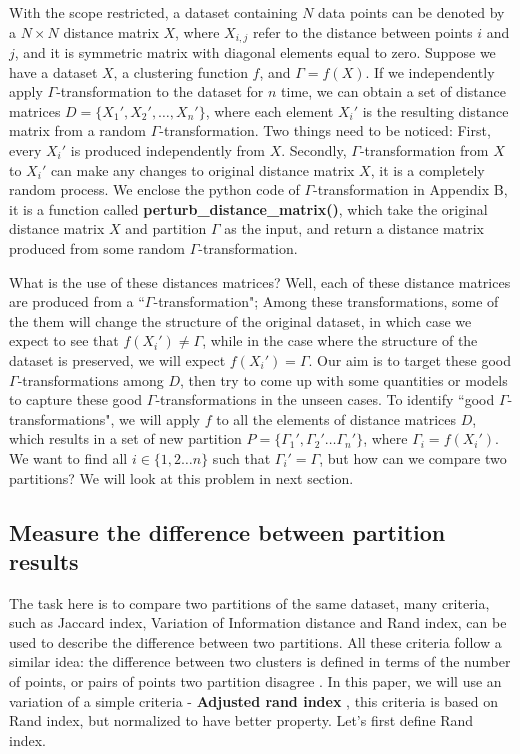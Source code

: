 \documentclass{uonmathreport}
\begin{document}
With the scope restricted, a dataset containing $N$ data points can be denoted by a $N\times N$ distance matrix $X$, where $X_{i,j}$ refer to the distance between points $i$ and $j$, and it is symmetric matrix with diagonal elements equal to zero. Suppose we have a dataset $X$, a clustering function $f$, and $\Gamma = f(X)$. If we independently apply $\Gamma$-transformation to the dataset for $n$ time, we can obtain a set of distance matrices $D = \{X_1',X_2',\ldots , X_n'\}$, where each element $X_i'$ is the resulting distance matrix from a random $\Gamma$-transformation. Two things need to be noticed: First, every $X_i'$ is produced independently from $X$. Secondly, $\Gamma$-transformation from $X$ to $X_i'$ can make any changes to original distance matrix $X$, it is a completely random process. We enclose the python code of $\Gamma$-transformation in Appendix B, it is a function called \textbf{perturb\_distance\_matrix()}, which take the original distance matrix $X$ and partition $\Gamma$ as the input, and return a distance matrix produced from some random $\Gamma$-transformation.

What is the use of these distances matrices? Well, each of these distance matrices are produced from a ``$\Gamma$-transformation"; Among these transformations, some of the them will change the structure of the original dataset, in which case we expect to see that $f(X_i')\neq \Gamma$, while in the case where the structure of the dataset is preserved, we will expect $f(X_i')= \Gamma$.  Our aim is to target these good $\Gamma$-transformations among $D$, then try to come up with some quantities or models to capture these good $\Gamma$-transformations in the unseen cases. To identify ``good $\Gamma$-transformations", we will apply $f$ to all the elements of distance matrices $D$, which results in a set of new partition $P = \{\Gamma_1',\Gamma_2' \ldots \Gamma_n' \}$, where $\Gamma_i = f(X_i')$. We want to find all $i\in \{1,2\ldots n\}$ such that $\Gamma_i' = \Gamma$, but how can we compare two partitions? We will look at this problem in next section.

\subsection{Measure the difference between partition results} \label{subsubsec:red}
The task here is to compare two partitions of the same dataset, many criteria, such as Jaccard index, Variation of Information distance \cite{meilua2003comparing} and Rand index, can be used to describe the difference between two partitions. All these criteria follow a similar idea: the difference between two clusters is defined in terms of the number of points, or pairs of points two partition disagree \cite{von2010clustering}. In this paper, we will use an variation of a simple criteria - \textbf{Adjusted rand index} , this criteria is based on Rand index, but normalized to have better property. Let's first define Rand index.
\end{document}
